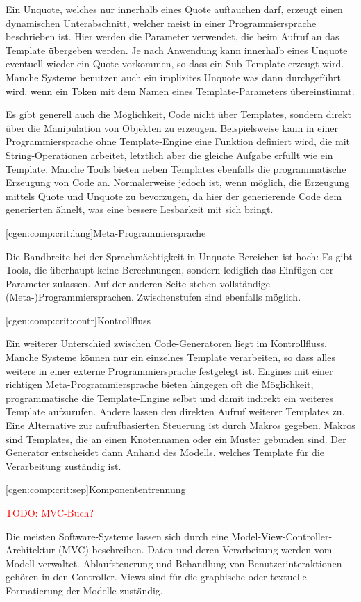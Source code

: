 \documentclass[a4paper, bibgerm]{book}
\newcommand{\todo}[1]{
  \textcolor{red}{TODO: #1}
}
\newcommand\lsubsubsection{}
\begin{document}
Ein Unquote, welches nur innerhalb eines Quote auftauchen darf, erzeugt
einen dynamischen Unterabschnitt, welcher meist in einer
Programmiersprache beschrieben ist. Hier werden die Parameter verwendet,
die beim Aufruf an das Template übergeben werden. Je nach Anwendung kann
innerhalb eines Unquote eventuell wieder ein Quote vorkommen, so dass
ein Sub-Template erzeugt wird. Manche Systeme benutzen auch ein
implizites Unquote was dann durchgeführt wird, wenn ein Token mit dem
Namen eines Template-Parameters übereinstimmt.

Es gibt generell auch die Möglichkeit, Code nicht über Templates,
sondern direkt über die Manipulation von Objekten zu
erzeugen. Beispielsweise kann in einer Programmiersprache ohne
Template-Engine eine Funktion definiert wird, die mit String-Operationen
arbeitet, letztlich aber die gleiche Aufgabe erfüllt wie ein
Template. Manche Tools bieten neben Templates ebenfalls die
programmatische Erzeugung von Code an. Normalerweise jedoch ist, wenn
möglich, die Erzeugung mittels Quote und Unquote zu bevorzugen, da hier
der generierende Code dem generierten ähnelt, was eine bessere
Lesbarkeit mit sich bringt.

\lsubsubsection[cgen:comp:crit:lang]{Meta-Programmiersprache}

Die Bandbreite bei der Sprachmächtigkeit in Unquote-Bereichen ist hoch:
Es gibt Tools, die überhaupt keine Berechnungen, sondern lediglich das
Einfügen der Parameter zulassen. Auf der anderen Seite stehen
vollständige (Meta-)Programmiersprachen. Zwischenstufen sind ebenfalls
möglich.

\lsubsubsection[cgen:comp:crit:contr]{Kontrollfluss}

Ein weiterer Unterschied zwischen Code-Generatoren liegt im
Kontrollfluss. Manche Systeme können nur ein einzelnes Template
verarbeiten, so dass alles weitere in einer externe Programmiersprache
festgelegt ist. Engines mit einer richtigen Meta-Programmiersprache
bieten hingegen oft die Möglichkeit, programmatische die Template-Engine
selbst und damit indirekt ein weiteres Template aufzurufen. Andere
lassen den direkten Aufruf weiterer Templates zu. Eine Alternative zur
aufrufbasierten Steuerung ist durch Makros gegeben. Makros sind
Templates, die an einen Knotennamen oder ein Muster gebunden sind. Der
Generator entscheidet dann Anhand des Modells, welches Template für die
Verarbeitung zuständig ist.

\lsubsubsection[cgen:comp:crit:sep]{Komponententrennung}
\todo{MVC-Buch?}
Die meisten Software-Systeme lassen sich durch eine
Model-View-Controller-Architektur (MVC) beschreiben. Daten und deren
Verarbeitung werden vom Modell verwaltet. Ablaufsteuerung und Behandlung
von Benutzerinteraktionen gehören in den Controller. Views sind für die
graphische oder textuelle Formatierung der Modelle zuständig.
\end{document}
